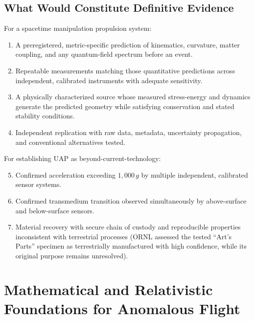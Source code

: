\documentclass[aps,prd,twocolumn,superscriptaddress,nofootinbib,floatfix]{revtex4-2}
\begin{document}
\subsection{What Would Constitute Definitive Evidence}\label{sec:evidence}

For a spacetime manipulation propulsion system:
\begin{enumerate}
  \item A preregistered, metric-specific prediction of kinematics, curvature,
        matter coupling, and any quantum-field spectrum before an event.
  \item Repeatable measurements matching those quantitative predictions across
        independent, calibrated instruments with adequate sensitivity.
  \item A physically characterized source whose measured stress-energy and
        dynamics generate the predicted geometry while satisfying conservation and
        stated stability conditions.
  \item Independent replication with raw data, metadata, uncertainty propagation,
        and conventional alternatives tested.
\end{enumerate}

For establishing UAP as beyond-current-technology:
\begin{enumerate}
  \setcounter{enumi}{4}
  \item Confirmed acceleration exceeding $1{,}000\,g$ by multiple independent,
        calibrated sensor systems.
  \item Confirmed transmedium transition observed simultaneously by above-surface
        and below-surface sensors.
  \item Material recovery with secure chain of custody and reproducible
        properties inconsistent with terrestrial processes (ORNL assessed the
        tested ``Art's Parts'' specimen as terrestrially manufactured with high
        confidence, while its original purpose remains unresolved).
\end{enumerate}

\section{Mathematical and Relativistic Foundations for Anomalous Flight}\label{sec:mathfoundations}
\end{document}
